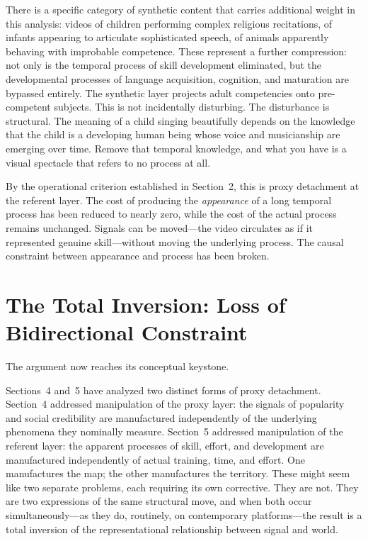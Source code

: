 \documentclass[12pt, a4paper]{article}
\begin{document}
There is a specific category of synthetic content that carries additional weight in this analysis: videos of children performing complex religious recitations, of infants appearing to articulate sophisticated speech, of animals apparently behaving with improbable competence. These represent a further compression: not only is the temporal process of skill development eliminated, but the developmental processes of language acquisition, cognition, and maturation are bypassed entirely. The synthetic layer projects adult competencies onto pre-competent subjects. This is not incidentally disturbing. The disturbance is structural. The meaning of a child singing beautifully depends on the knowledge that the child is a developing human being whose voice and musicianship are emerging over time. Remove that temporal knowledge, and what you have is a visual spectacle that refers to no process at all.

By the operational criterion established in Section~2, this is proxy detachment at the referent layer. The cost of producing the \textit{appearance} of a long temporal process has been reduced to nearly zero, while the cost of the actual process remains unchanged. Signals can be moved---the video circulates as if it represented genuine skill---without moving the underlying process. The causal constraint between appearance and process has been broken.

\section{The Total Inversion: Loss of Bidirectional Constraint}

The argument now reaches its conceptual keystone.

Sections~4 and~5 have analyzed two distinct forms of proxy detachment. Section~4 addressed manipulation of the proxy layer: the signals of popularity and social credibility are manufactured independently of the underlying phenomena they nominally measure. Section~5 addressed manipulation of the referent layer: the apparent processes of skill, effort, and development are manufactured independently of actual training, time, and effort. One manufactures the map; the other manufactures the territory. These might seem like two separate problems, each requiring its own corrective. They are not. They are two expressions of the same structural move, and when both occur simultaneously---as they do, routinely, on contemporary platforms---the result is a total inversion of the representational relationship between signal and world.
\end{document}
